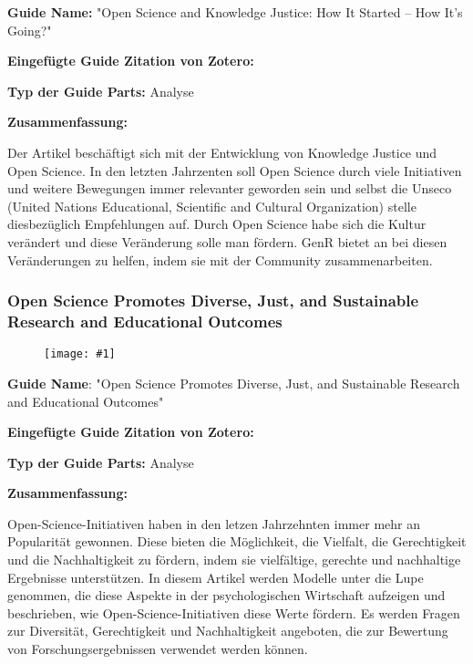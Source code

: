\documentclass{article}
\newlength{\imgwidth}
\newcommand\scaledgraphics[2]{%
                
\settowidth{\imgwidth}{\texttt{[image: \#1]}}%
                
\setlength{\imgwidth}{\minof{\imgwidth}{#2\textwidth}}%
                
\texttt{[image: \#1]}%
                
}
\begin{document}
\textbf{Guide Name:} "Open Science and Knowledge Justice: How It Started – How It’s Going?"


\textbf{Eingefügte Guide Zitation von Zotero:} \autocite{noauthor_open_2021}


\textbf{Typ der Guide Parts:} Analyse


\textbf{Zusammenfassung:} 

Der Artikel beschäftigt sich mit der Entwicklung von Knowledge Justice und Open Science. In den letzten Jahrzenten soll Open Science durch viele Initiativen und weitere Bewegungen immer relevanter geworden sein und selbst die Unseco (United Nations Educational, Scientific and Cultural Organization) stelle diesbezüglich Empfehlungen auf. Durch Open Science habe sich die Kultur verändert und diese Veränderung solle man fördern. GenR bietet an bei diesen Veränderungen zu helfen, indem sie mit der Community zusammenarbeiten.


\subsubsection{Open Science Promotes Diverse, Just, and Sustainable Research and Educational Outcomes}\label{H4807510}


\begin{figure}
\scaledgraphics{23f9ee73-dda2-4a56-8083-4a618f9983b9.png}{1}
\label{F46402811}
\end{figure}





\textbf{Guide Name}: "Open Science Promotes Diverse, Just, and Sustainable Research and Educational Outcomes"


\textbf{Eingefügte Guide Zitation von Zotero:} \autocite{grahe_open_2019}


\textbf{Typ der Guide Parts: }Analyse


\textbf{Zusammenfassung:} 

Open-Science-Initiativen haben in den letzen Jahrzehnten immer mehr an Popularität gewonnen. Diese bieten die Möglichkeit, die Vielfalt, die Gerechtigkeit und die Nachhaltigkeit zu fördern, indem sie vielfältige, gerechte und nachhaltige Ergebnisse unterstützen. In diesem Artikel werden Modelle unter die Lupe genommen, die diese Aspekte in der psychologischen Wirtschaft aufzeigen und beschrieben, wie Open-Science-Initiativen diese Werte fördern. Es werden Fragen zur Diversität, Gerechtigkeit und Nachhaltigkeit angeboten, die zur Bewertung von Forschungsergebnissen verwendet werden können.


\printbibliography[title={Literaturverzeichnis}]
\end{document}
